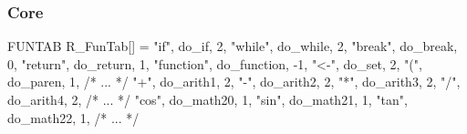 \documentclass{beamer}
\begin{document}
\begin{frame}[fragile]
    \frametitle{\R{} Core}

\begin{ccode}
FUNTAB R_FunTab[] = {
  {"if",        do_if,        2},
  {"while",     do_while,     2},
  {"break",     do_break,     0},
  {"return",    do_return,    1},
  {"function",  do_function,  -1},
  {"<-",        do_set,       2},
  {"(",         do_paren,     1},
  /* ... */
  {"+",         do_arith1,    2},
  {"-",         do_arith2,    2},
  {"*",         do_arith3,    2},
  {"/",         do_arith4,    2},
  /* ... */
  {"cos",       do_math20,    1},
  {"sin",       do_math21,    1},
  {"tan",       do_math22,    1},
  /* ... */ }
\end{ccode}

    \begin{overlayarea}{\textwidth}{0cm}
    \end{overlayarea}


\end{frame}
\end{document}
